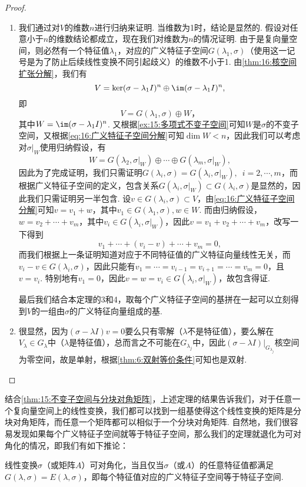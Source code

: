 \begin{proof}
\begin{enumerate}
        \item 我们通过对$V$的维数$n$进行归纳来证明. 当维数为1时，结论是显然的. 假设对任意小于$n$的维数结论都成立，现在我们对维数为$n$的情况证明. 由于是复向量空间，则必然有一个特征值$\lambda_1$，对应的广义特征子空间$G(\lambda_1,\sigma)$（使用这一记号是为了防止后续线性变换不同引起歧义）的维数不小于1. 由\autoref{thm:16:核空间扩张分解}，我们有
        \[V=\ker(\sigma-\lambda_1 I)^n\oplus\im(\sigma-\lambda_1 I)^n,\]
        即
        \begin{equation} \label{eq:16:广义特征子空间分解}
            V=G(\lambda_1,\sigma)\oplus W，
        \end{equation}
        其中$W=\im(\sigma-\lambda_1 I)^n$. 又根据\autoref{ex:15:多项式不变子空间}可知$W$是$\sigma$的不变子空间，又根据\autoref{eq:16:广义特征子空间分解}可知$\dim W<n$，因此我们可以考虑对$\sigma\vert_W$使用归纳假设，有
        \[W=G(\lambda_2,\sigma\vert_W)\oplus\cdots\oplus G(\lambda_m,\sigma\vert_W),\]
        因此为了完成证明，我们只需证明$G(\lambda_i,\sigma)=G(\lambda_i,\sigma\vert_W),\enspace i=2,\cdots,m$，而根据广义特征子空间的定义，包含关系$G(\lambda_i,\sigma\vert_W)\subset G(\lambda_i,\sigma)$是显然的，因此我们只需证明另一半包含. 设$v\in G(\lambda_i,\sigma)\subset V$，由\autoref{eq:16:广义特征子空间分解}可知$v=v_1+w$，其中$v_1\in G(\lambda_1,\sigma),w\in W$. 而由归纳假设，$w=v_2+\cdots+v_m$，其中$v_i\in G(\lambda_i,\sigma\vert_W)$，因此$v=v_1+v_2+\cdots+v_m$，改写一下得到
        \[v_1+\cdots+(v_i-v)+\cdots+v_m=0,\]
        而我们根据上一条证明知道对应于不同特征值的广义特征向量线性无关，而$v_i-v\in G(\lambda_i,\sigma)$，因此只能有$v_1=\cdots=v_{i-1}=v_{i+1}=\cdots=v_m=0$，且$v=v_i$. 特别地有$v_1=0$，因此$v=w=v_i\in G(\lambda_i,\sigma\vert_W)$，故包含得证.

        最后我们结合本定理的3和4，取每个广义特征子空间的基拼在一起可以立刻得到$V$的一组由$\sigma$的广义特征向量组成的基.

        \item 很显然，因为$(\sigma-\lambda I)v=0$要么只有零解（$\lambda$不是特征值），要么解在$V_\lambda\in G_\lambda$中（$\lambda$是特征值），总而言之不可能在$G_{\lambda_j}$中，因此$(\sigma-\lambda I)\vert_{G_{\lambda_j}}$核空间为零空间，故是单射，根据\autoref{thm:6:双射等价条件}可知也是双射.
    \end{enumerate}
\end{proof}

结合\autoref{thm:15:不变子空间与分块对角矩阵}，上述定理的结果告诉我们，对于任意一个复向量空间上的线性变换，我们都可以找到一组基使得这个线性变换的矩阵是分块对角矩阵，而任意一个矩阵都可以相似于一个分块对角矩阵. 自然地，我们很容易发现如果每个广义特征子空间就等于特征子空间，那么我们的定理就退化为可对角化的情况，即我们有如下推论：
\begin{corollary}
    线性变换$\sigma$（或矩阵$A$）可对角化，当且仅当$\sigma$（或$A$）的任意特征值都满足$G(\lambda,\sigma)=E(\lambda,\sigma)$，即每个特征值对应的广义特征子空间等于特征子空间.
\end{corollary}

